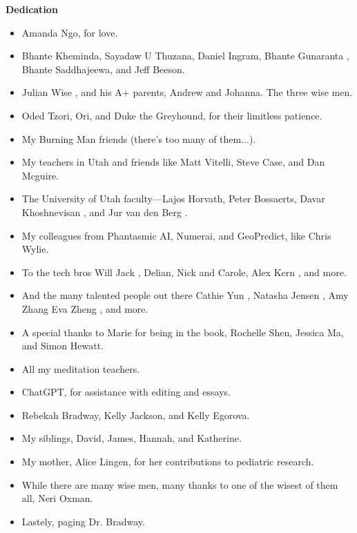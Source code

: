 \begin{titlepage}
    \centering
    {\Huge \bfseries Dedication}\par
    \vspace{2cm}
    \begin{itemize}
        \item Amanda Ngo, for love. \cite{gafori} \cite{bradway} \cite{green}
        \item Bhante Kheminda, Sayadaw U Thuzana, Daniel Ingram, Bhante Gunaranta \cite{guna} \cite{bhavana}, Bhante Saddhajeewa, and Jeff Beeson.
        \item Julian Wise \cite{yale}, and his A+ parents, Andrew and Johanna. The three wise men.
        \item Oded Tzori, Ori, and Duke the Greyhound, for their limitless patience.
        \item My Burning Man friends (there's too many of them...).
        \item My teachers in Utah and friends like Matt Vitelli, Steve Case, and Dan Mcguire.
        \item The University of Utah faculty—Lajos Horvath, Peter Bossaerts, Davar Khoshnevisan \cite{davar}, and Jur van den Berg \cite{utah}.
        \item My colleagues from Phantasmic AI, Numerai, and GeoPredict, like Chris Wylie.
        \item To the tech bros Will Jack \cite{mit}, Delian, Nick and Carole, Alex Kern \cite{berkeley}, and more.
        \item And the many talented people out there Cathie Yun \cite{mit}, Natasha Jensen \cite{mit}, Amy Zhang \cite{mit} Eva Zheng \cite{berkeley}, and more.
        \item A special thanks to Marie for being in the book, Rochelle Shen, Jessica Ma, and Simon Hewatt.
        \item All my meditation teachers.
        \item ChatGPT, for assistance with editing and essays.
        \item Rebekah Bradway, Kelly Jackson, and Kelly Egorova.
        \item My siblings, David, James, Hannah, and Katherine.
        \item My mother, Alice Lingen, for her contributions to pediatric research.
        \item While there are many wise men, many thanks to one of the wisest of them all, Neri Oxman.
        \item Lastely, paging Dr. Bradway.
    \end{itemize}
    \vfill
\end{titlepage}
